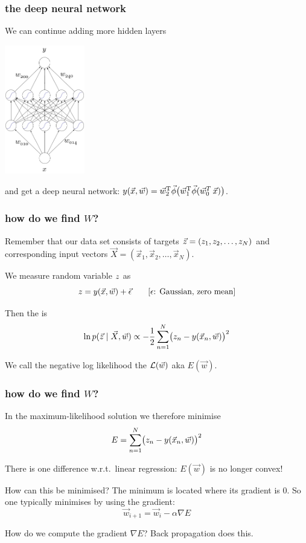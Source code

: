 \documentclass[USenglish,pdftex,compress,10pt,svgnamesi,handout]{beamer}
\newcommand{\bfw}{\Vec{w}}
\begin{document}
\begin{frame}
\frametitle{the deep neural network}
We can continue adding more hidden layers

\centerline{\includegraphics[width=35mm]{nn-deep-pict}}

and get a deep neural network:
$
	y(\Vec{x},\Vec{w}) =
		  \Vec{w}_2^{\text{T}}\Vec{\phi}\bigl(\Vec{w}_1^{\text{T}}\Vec{\phi}(\Vec{w}_0^T\,\Vec{x})\bigr)
$.
\end{frame}




\begin{frame}
\frametitle{how do we find $W$?}

Remember that our data set consists of targets $\Vec{z}=(z_1,z_2,\ldots,z_N)$ 
and corresponding input vectors $\Vec{X}=(\Vec{x}_1,\Vec{x}_2,\ldots,\Vec{x}_N)$.

We measure random variable  $z$ as
\begin{equation}
	z=y(\Vec{x},\Vec{w}) + \Vec{\epsilon} \qquad\text{[$\epsilon$: Gaussian, zero mean]}
\end{equation}

Then the  is
\begin{equation}\label{eqn:likelihood}
  \ln p(\Vec{z}\mid \Vec{X},\Vec{w}) \propto
    -{1\over2} \sum_{n=1}^N \bigl(z_n - y(\Vec x_n, \Vec w)\bigr)^2
\end{equation}

We call the negative log likelihood the  ${\cal L}(\Vec w)$ aka $E(\Vec w)$.
\end{frame}



\begin{frame}
\frametitle{how do we find $W$?}
In the maximum-likelihood solution we therefore minimise
$$E = \sum_{n=1}^N \bigl(z_n - y(\Vec x_n, \Vec w)\bigr)^2$$

There is one difference w.r.t.\ linear regression: $E(\Vec w)$ is no longer convex!

How can this be minimised?  The minimum is located where its gradient is 0.
So one typically minimises by using the gradient:
$$\bfw_{i+1} = \bfw_i - \alpha \nabla E$$

How do we compute the gradient $\nabla E$?  
Back propagation does this.
\end{frame}
\end{document}
